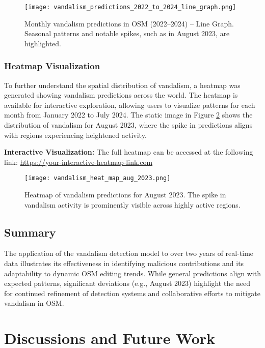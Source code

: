 \documentclass[
    13pt, %
    a4paper, %
    DIV14, %
    listof=totoc, %
    bibliography=totoc, %
    index=totoc, %
    headsepline
]{scrreprt}
\begin{document}
\begin{figure}[H]
    \centering
    \texttt{[image: vandalism\_predictions\_2022\_to\_2024\_line\_graph.png]}
    \caption{Monthly vandalism predictions in OSM (2022–2024) – Line Graph. Seasonal patterns and notable spikes, such as in August 2023, are highlighted.}
    \label{fig:vandalism_line_graph}
\end{figure}

\subsection{Heatmap Visualization}
To further understand the spatial distribution of vandalism, a heatmap was generated showing vandalism predictions across the world. The heatmap is available for interactive exploration, allowing users to visualize patterns for each month from January 2022 to July 2024. The static image in Figure \ref{fig:vandalism_heatmap_aug_2023} shows the distribution of vandalism for August 2023, where the spike in predictions aligns with regions experiencing heightened activity.

\noindent\textbf{Interactive Visualization:} The full heatmap can be accessed at the following link: \url{https://your-interactive-heatmap-link.com}

\begin{figure}[H]
    \centering
    \texttt{[image: vandalism\_heat\_map\_aug\_2023.png]}
    \caption{Heatmap of vandalism predictions for August 2023. The spike in vandalism activity is prominently visible across highly active regions.}
    \label{fig:vandalism_heatmap_aug_2023}
\end{figure}


\section{Summary}
The application of the vandalism detection model to over two years of real-time data illustrates its effectiveness in identifying malicious contributions and its adaptability to dynamic OSM editing trends. While general predictions align with expected patterns, significant deviations (e.g., August 2023) highlight the need for continued refinement of detection systems and collaborative efforts to mitigate vandalism in OSM.

\chapter{Discussions and Future Work}
\label{chapter:discussions_and_future_work}
\end{document}
